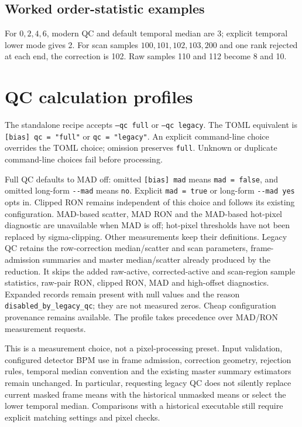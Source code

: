 \documentclass[11pt,a4paper]{article}
\newcommand{\code}[1]{\nolinkurl{#1}}
\begin{document}
\subsection*{Worked order-statistic examples}
For $0,2,4,6$, modern QC and default temporal median are 3; explicit temporal lower mode gives 2.
For scan samples $100,101,102,103,200$ and one rank rejected at each end,
the correction is 102. Raw samples 110 and 112 become 8 and 10.

\newpage
\section{QC calculation profiles}
The standalone recipe accepts \texttt{--qc full} or \texttt{--qc legacy}.
The TOML equivalent is \texttt{[bias] qc = "full"} or
\texttt{qc = "legacy"}. An explicit command-line choice overrides the TOML
choice; omission preserves \code{full}. Unknown or duplicate command-line
choices fail before processing.

Full QC defaults to MAD off: omitted \texttt{[bias] mad} means
\texttt{mad = false}, and omitted long-form \code{--mad} means \code{no}.
Explicit \texttt{mad = true} or long-form \code{--mad yes} opts in.
Clipped RON remains independent of this choice and follows its existing
configuration. MAD-based scatter, MAD RON and the MAD-based hot-pixel
diagnostic are unavailable when MAD is off; hot-pixel thresholds have not
been replaced by sigma-clipping. Other measurements keep their definitions.
Legacy QC retains the row-correction median/scatter and scan parameters,
frame-admission summaries and master median/scatter already produced by the
reduction. It skips the added raw-active, corrected-active and scan-region
sample statistics, raw-pair RON, clipped RON, MAD and high-offset diagnostics.
Expanded records remain present with null values and the reason
\code{disabled_by_legacy_qc}; they are not measured zeros. Cheap
configuration provenance remains available. The profile takes precedence
over MAD/RON measurement requests.

This is a measurement choice, not a pixel-processing preset. Input validation,
configured detector BPM use in frame admission, correction geometry,
rejection rules, temporal median convention and the existing master summary
estimators remain unchanged. In particular, requesting legacy QC does not
silently replace current masked frame means with the historical unmasked
means or select the lower temporal median. Comparisons with a historical
executable still require explicit matching settings and pixel checks.
\end{document}
